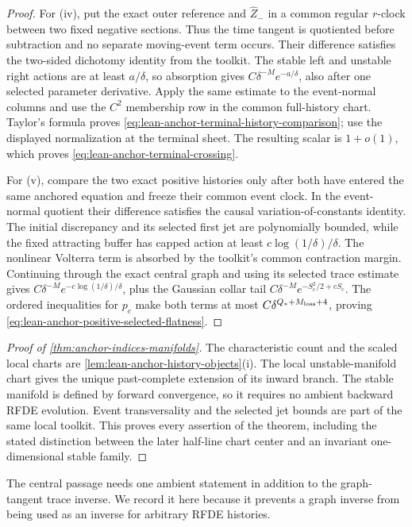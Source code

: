 \begin{proof}
For (iv), put the exact outer reference and \(\widehat Z_-\) in a common
regular \(r\)-clock between two fixed negative sections.  Thus the time
tangent is quotiented before subtraction and no separate moving-event term
occurs.  Their difference
satisfies the two-sided dichotomy identity from the toolkit.  The stable
left and unstable right actions are at least \(a/\delta\), so absorption
gives \(C\delta^{-M}e^{-a/\delta}\), also after one selected parameter
derivative.  Apply the same estimate to the event-normal columns and use
the \(C^2\) membership row in the common full-history chart.  Taylor's
formula proves \cref{eq:lean-anchor-terminal-history-comparison}; use the
displayed normalization at the terminal sheet.  The resulting scalar
is \(1+o(1)\), which proves
\cref{eq:lean-anchor-terminal-crossing}.

For (v), compare the two exact positive histories only after both have
entered the same anchored equation and freeze their common event clock.  In
the event-normal quotient their difference satisfies the causal
variation-of-constants identity.  The initial discrepancy and its selected
first jet are polynomially bounded, while the fixed attracting buffer has
capped action at least \(c\log(1/\delta)/\delta\).  The nonlinear Volterra
term is absorbed by the toolkit's common contraction margin.  Continuing
through the exact central graph and using its selected trace estimate gives
\(C\delta^{-M}e^{-c\log(1/\delta)/\delta}\), plus the Gaussian collar tail
\(C\delta^{-M}e^{-S_c^2/2+cS_c}\).  The ordered inequalities for \(p_c\)
make both terms at most \(C\delta^{Q_*+M_{\rm loss}+4}\), proving
\cref{eq:lean-anchor-positive-selected-flatness}.
\end{proof}

\begin{proof}[Proof of \cref{thm:anchor-indices-manifolds}]
The characteristic count and the scaled local charts are
\cref{lem:lean-anchor-history-objects}(i).  The local unstable-manifold
chart gives the unique past-complete extension of its inward branch.  The
stable manifold is defined by forward convergence, so it requires no
ambient backward RFDE evolution.  Event transversality and the selected
jet bounds are part of the same local toolkit.  This proves every assertion
of the theorem, including the stated distinction between the later
half-line chart center and an invariant one-dimensional stable family.
\end{proof}

The central passage needs one ambient statement in addition to the
graph-tangent trace inverse.  We record it here because it prevents a
graph inverse from being used as an inverse for arbitrary RFDE histories.

